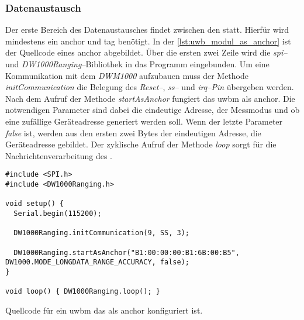 \subsubsection{Datenaustausch}

Der erste Bereich des Datenaustausches findet zwischen den  statt. Hierfür wird mindestens ein \Gls{anchor} und \Gls{tag} benötigt. In der \autoref{lst:uwb_modul_as_anchor} ist der Quellcode eines \Gls{anchor} abgebildet.
Über die ersten zwei Zeile wird die \textit{\Gls{spi}--} und \textit{DW1000Ranging}--Bibliothek in das Programm eingebunden.
Um eine Kommunikation mit dem \textit{DWM1000} aufzubauen muss der Methode \textit{initCommunication} die Belegung des \textit{Reset--}, \textit{\Gls{ss}--} und \textit{\Gls{irq}--Pin} übergeben werden.
Nach dem Aufruf der Methode \textit{startAsAnchor} fungiert das \Gls{uwbm} als \Gls{anchor}. Die notwendigen Parameter sind dabei die eindeutige Adresse, der Messmodus und ob eine zufällige Geräteadresse generiert werden soll. Wenn der letzte Parameter \textit{false} ist, werden aus den ersten zwei Bytes der eindeutigen Adresse, die Geräteadresse gebildet. Der zyklische Aufruf der Methode \textit{loop} sorgt für die Nachrichtenverarbeitung des .

\begin{listing}
	\begin{verbatim}
#include <SPI.h>
#include <DW1000Ranging.h>

void setup() {
  Serial.begin(115200);

  DW1000Ranging.initCommunication(9, SS, 3);
  
  DW1000Ranging.startAsAnchor("B1:00:00:00:B1:6B:00:B5", DW1000.MODE_LONGDATA_RANGE_ACCURACY, false);
}

void loop() { DW1000Ranging.loop(); }
	\end{verbatim}
	\unskip
	\caption{Quellcode für ein \Gls{uwbm} das als \Gls{anchor} konfiguriert ist.}
	\label{lst:uwb_modul_as_anchor}
\end{listing}

